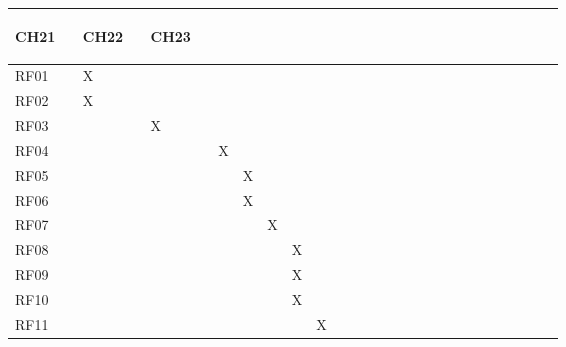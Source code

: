 \begin{table}[H]
\begin{tabular}{|l|l|l|l|l|l|l|l|l|l|l|l|l|l|l|l|l|l|l|l|l|l|l|l|}
\begin{turn}{90}CH21 \ \end{turn} & \begin{turn}{90}CH22 \ \end{turn} & \begin{turn}{90}CH23 \ \end{turn} \\ \hline
RF01&   X   &      &      &      &      &      &      &      &      &      &      &      &      &      &      &      &      &      &      &      &      &      &      \\ \hline
RF02&   X  &      &      &      &      &      &      &      &      &      &      &      &      &      &      &      &      &      &      &      &      &      &      \\ \hline
RF03&      &   X   &      &      &      &      &      &      &      &      &      &      &      &      &      &      &      &      &      &      &      &      &      \\ \hline
RF04&      &      &   X   &      &      &      &      &      &      &      &      &      &      &      &      &      &      &      &      &      &      &      &      \\ \hline
RF05&      &      &      &   X   &      &      &      &      &      &      &      &      &      &      &      &      &      &      &      &      &      &      &      \\ \hline
RF06&      &      &      &   X   &      &      &      &      &      &      &      &      &      &      &      &      &      &      &      &      &      &      &      \\ \hline
RF07&      &      &      &      &   X   &      &      &      &      &      &      &      &      &      &      &      &      &      &      &      &      &      &      \\ \hline
RF08&      &      &      &      &      &    X  &      &      &      &      &      &      &      &      &      &      &      &      &      &      &      &      &      \\ \hline
RF09&      &      &      &      &      &    X  &      &      &      &      &      &      &      &      &      &      &      &      &      &      &      &      &      \\ \hline
RF10&      &      &      &      &      &    X  &      &      &      &      &      &      &      &      &      &      &      &      &      &      &      &      &      \\ \hline
RF11&      &      &      &      &      &      &   X   &      &      &      &      &      &      &      &      &      &      &      &      &      &      &      &      \\ \hline

\end{tabular}
\end{table}
